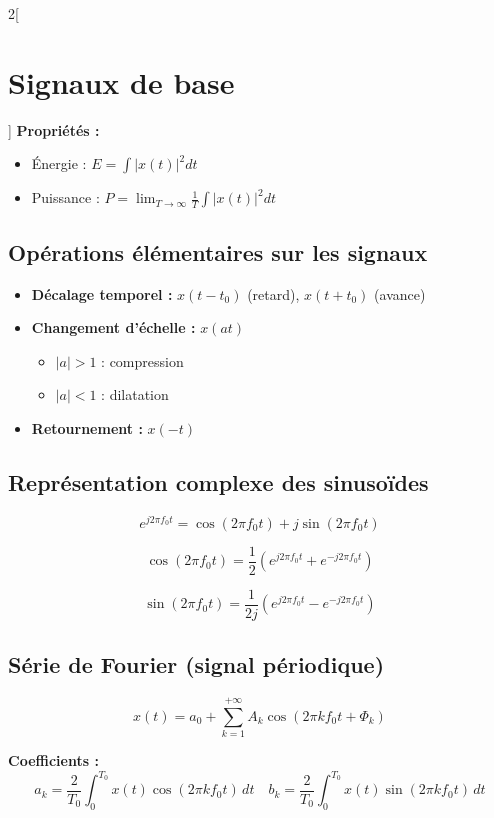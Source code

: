 \documentclass[a4paper,10pt]{article}
\begin{document}
\begin{multicols}{2}[
        \section{Signaux de base}
    ]
        \textbf{Propriétés :}
        \begin{itemize}
            \item Énergie : $E = \int |x(t)|^2 dt$
            \item Puissance : $P = \lim_{T \to \infty} \frac{1}{T} \int |x(t)|^2 dt$
        \end{itemize}

        \subsection*{Opérations élémentaires sur les signaux}

        \begin{itemize}
            \item \textbf{Décalage temporel :} $x(t-t_0)$ (retard), $x(t+t_0)$ (avance)
            \item \textbf{Changement d'échelle :} $x(at)$ 
            \begin{itemize}
                \item $|a|>1$ : compression
                \item $|a|<1$ : dilatation
            \end{itemize}
            \item \textbf{Retournement :} $x(-t)$
        \end{itemize}

        \subsection*{Représentation complexe des sinusoïdes}

        \[
        e^{j2\pi f_0 t} = \cos(2\pi f_0 t) + j \sin(2\pi f_0 t)
        \]

        \[
        \cos(2\pi f_0 t) = \frac{1}{2}(e^{j2\pi f_0 t} + e^{-j2\pi f_0 t})
        \]

        \[
        \sin(2\pi f_0 t) = \frac{1}{2j}(e^{j2\pi f_0 t} - e^{-j2\pi f_0 t})
        \]


        \subsection*{Série de Fourier (signal périodique)}

        \[
        x(t) = a_0 + \sum_{k=1}^{+\infty} A_k \cos(2\pi k f_0 t + \Phi_k)
        \]

        \textbf{Coefficients :}
        \[
        a_k = \frac{2}{T_0} \int_0^{T_0} x(t)\cos(2\pi k f_0 t)\,dt
        \quad
        b_k = \frac{2}{T_0} \int_0^{T_0} x(t)\sin(2\pi k f_0 t)\,dt
        \]


\end{multicols}
\end{document}
